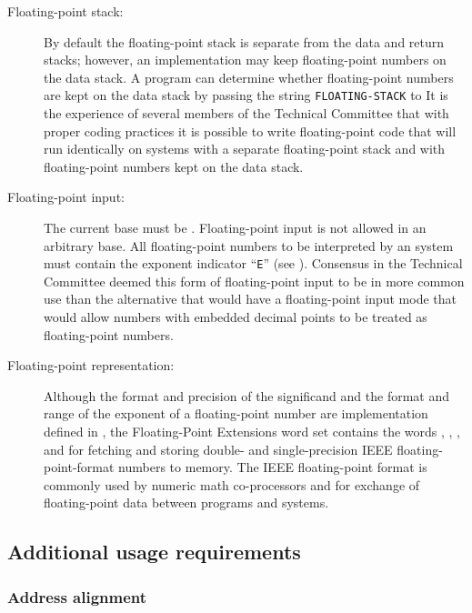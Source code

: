 \begin{description}
\item [Floating-point stack:]
	By default the floating-point stack is separate from the data
	and return stacks; however, an implementation may keep
	floating-point numbers on the data stack. A program can determine
	whether floating-point numbers are kept on the data stack by
	passing the string \linebreak \texttt{FLOATING-STACK} to 
	It is the experience of several members of the Technical Committee
	that with proper coding practices it is possible to write
	floating-point code that will run identically on systems with a
	separate floating-point stack and with floating-point numbers kept
	on the data stack.

\item[Floating-point input:]
	The current base must be . Floating-point input
	is not allowed in an arbitrary base. All floating-point numbers to
	be interpreted by an  system must contain the exponent
	indicator ``\texttt{E}'' (see ). Consensus in the Technical
	Committee deemed this form of floating-point input to be in more
	common use than the alternative that would have a floating-point
	input mode that would allow numbers with embedded decimal points
	to be treated as floating-point numbers.

\item[Floating-point representation:]
	Although the format and precision of the significand and the format
	and range of the exponent of a floating-point number are
	implementation defined in , the Floating-Point Extensions
	word set contains the words
	, , , and 
	for fetching and storing double- and single-precision IEEE
	floating-point-format numbers to memory. The IEEE floating-point
	format is commonly used by numeric math co-processors and for
	exchange of floating-point data between programs and systems.
\end{description}

\setcounter{subsection}{2}
\subsection{Additional usage requirements} %

\setcounter{subsubsection}{4}
\subsubsection{Address alignment} %

